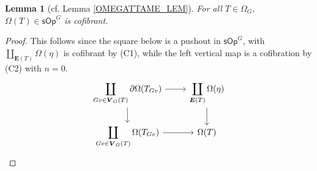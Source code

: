 \documentclass[a4paper,10pt
,draft
]{article}%
\numberwithin{equation}{section}
\numberwithin{figure}{section}
\newtheorem{lemma}[equation]{Lemma}%
\theoremstyle{definition} %
\newcommand{\longto}{\longrightarrow}%
\newcommand{\Set}{\ensuremath{\mathsf{Set}}}
\newcommand{\sOp}{\ensuremath{\mathsf{sOp}}}%
\newcommand{\1}{\ensuremath{\mathbbm 1}}%
\begin{document}
\begin{lemma}[cf. Lemma \ref{OMEGATTAME_LEM}]
      For all $T \in \Omega_G$, $\Omega(T) \in \sOp^G$ is cofibrant.
\end{lemma}
\begin{proof}
      This follows since the square below is a pushout in $\sOp^G$,
      with $\coprod_{\boldsymbol{E}(T)} \Omega(\eta)$ is cofibrant by (C1), while
      the left vertical map is a cofibration by (C2) with $n=0$.
      \[
            \begin{tikzcd}
                  \displaystyle{
                    \coprod_{Gv \in \boldsymbol{V}_G(T)} \partial \Omega(T_{Gv})
                  }
                  \arrow[d] \arrow[r]
                  &
                  \displaystyle{
                    \coprod_{\boldsymbol{E}(T)} \Omega(\eta)
                  }
                  \arrow[d]
                  \\
                  \displaystyle{
                    \coprod_{Gv \in \boldsymbol{V}_G(T)} \Omega(T_{Gv})
                  }
                  \arrow[r]
                  &
                  \Omega(T)
            \end{tikzcd}
      \]
\end{proof}
\end{document}
